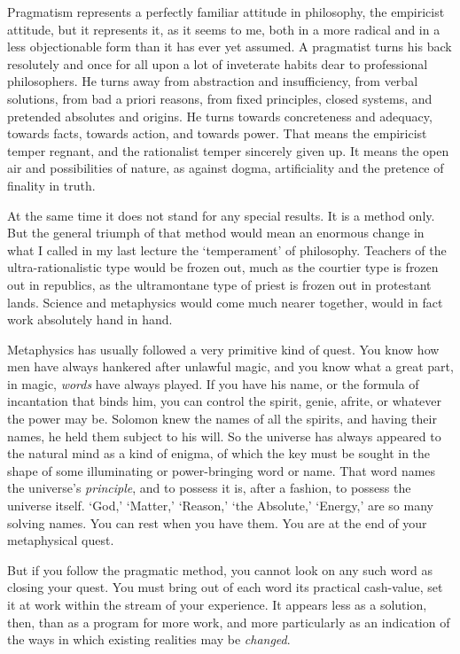 \documentclass[]{article}
\begin{document}
Pragmatism represents a perfectly familiar attitude in philosophy, the
empiricist attitude, but it represents it, as it seems to me, both in
a more radical and in a less objectionable form than it has ever yet
assumed. A pragmatist turns his back resolutely and once for all upon
a lot of inveterate habits dear to professional philosophers. He turns
away from abstraction and insufficiency, from verbal solutions, from bad
a priori reasons, from fixed principles, closed systems, and pretended
absolutes and origins. He turns towards concreteness and adequacy,
towards facts, towards action, and towards power. That means the
empiricist temper regnant, and the rationalist temper sincerely given
up. It means the open air and possibilities of nature, as against dogma,
artificiality and the pretence of finality in truth.

At the same time it does not stand for any special results. It is
a method only. But the general triumph of that method would mean an
enormous change in what I called in my last lecture the `temperament'
of philosophy. Teachers of the ultra-rationalistic type would be frozen
out, much as the courtier type is frozen out in republics, as the
ultramontane type of priest is frozen out in protestant lands. Science
and metaphysics would come much nearer together, would in fact work
absolutely hand in hand.

Metaphysics has usually followed a very primitive kind of quest. You
know how men have always hankered after unlawful magic, and you know
what a great part, in magic, \emph{words} have always played. If you have his
name, or the formula of incantation that binds him, you can control the
spirit, genie, afrite, or whatever the power may be. Solomon knew the
names of all the spirits, and having their names, he held them subject
to his will. So the universe has always appeared to the natural mind as
a kind of enigma, of which the key must be sought in the shape of
some illuminating or power-bringing word or name. That word names the
universe's \emph{principle}, and to possess it is, after a fashion, to
possess the universe itself. `God,' `Matter,' `Reason,' `the Absolute,'
`Energy,' are so many solving names. You can rest when you have them.
You are at the end of your metaphysical quest.

But if you follow the pragmatic method, you cannot look on any such word
as closing your quest. You must bring out of each word its practical
cash-value, set it at work within the stream of your experience. It
appears less as a solution, then, than as a program for more work,
and more particularly as an indication of the ways in which existing
realities may be \emph{changed}.
\end{document}
